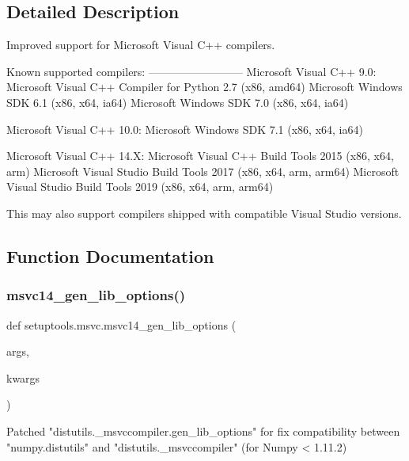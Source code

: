 \subsection{Detailed Description}
\begin{DoxyVerb}Improved support for Microsoft Visual C++ compilers.

Known supported compilers:
--------------------------
Microsoft Visual C++ 9.0:
    Microsoft Visual C++ Compiler for Python 2.7 (x86, amd64)
    Microsoft Windows SDK 6.1 (x86, x64, ia64)
    Microsoft Windows SDK 7.0 (x86, x64, ia64)

Microsoft Visual C++ 10.0:
    Microsoft Windows SDK 7.1 (x86, x64, ia64)

Microsoft Visual C++ 14.X:
    Microsoft Visual C++ Build Tools 2015 (x86, x64, arm)
    Microsoft Visual Studio Build Tools 2017 (x86, x64, arm, arm64)
    Microsoft Visual Studio Build Tools 2019 (x86, x64, arm, arm64)

This may also support compilers shipped with compatible Visual Studio versions.
\end{DoxyVerb}
 

\subsection{Function Documentation}
\mbox{\label{namespacesetuptools_1_1msvc_aa2d697d927b0bed28a47be76cea5a729}} 
\subsubsection{\texorpdfstring{msvc14\+\_\+gen\+\_\+lib\+\_\+options()}{msvc14\_gen\_lib\_options()}}
{\footnotesize\ttfamily def setuptools.\+msvc.\+msvc14\+\_\+gen\+\_\+lib\+\_\+options (\begin{DoxyParamCaption}\item[{}]{args,  }\item[{}]{kwargs }\end{DoxyParamCaption})}

\begin{DoxyVerb}Patched "distutils._msvccompiler.gen_lib_options" for fix
compatibility between "numpy.distutils" and "distutils._msvccompiler"
(for Numpy < 1.11.2)
\end{DoxyVerb}
 \mbox{\label{namespacesetuptools_1_1msvc_abf4312c4a50e38b0965b836584cf402c}} 
